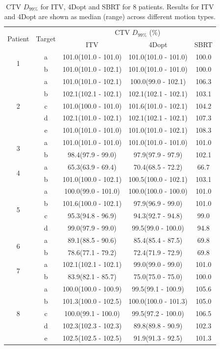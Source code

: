
\begin{table}[H]
	\centering
	\caption{CTV $D_{99\%}$ for ITV, 4Dopt and SBRT for 8 patients. Results for ITV and 4Dopt are shown as median (range) across different motion types.}
	\begin{tabular}{c|c|c|c|c}
		\hline\hline
		\multirow{2}{*}{Patient} & \multirow{2}{*}{Target} & \multicolumn{3}{|c}{CTV $D_{99\%}$ (\%)}  \\
		 &  & ITV & 4Dopt & SBRT \\
		 \hline
		 
\multirow{2}{*}{1} & a & 101.0(101.0 - 101.0) & 101.0(101.0 - 101.0) & 100.0\\ 
 & b & 101.0(101.0 - 102.1) & 101.0(101.0 - 101.0) & 100.0\\ 
 \hline
\multirow{5}{*}{2} & a & 101.0(101.0 - 102.1) & 100.0(99.0 - 102.1) & 106.3\\ 
 & b & 102.1(102.1 - 102.1) & 102.1(102.1 - 102.1) & 103.1\\ 
 & c & 101.0(100.0 - 101.0) & 101.6(101.0 - 102.1) & 104.2\\ 
 & d & 102.1(101.0 - 102.1) & 102.1(102.1 - 102.1) & 107.3\\ 
 & e & 101.0(101.0 - 101.0) & 101.0(101.0 - 102.1) & 108.3\\ 
 \hline
\multirow{2}{*}{3} & a & 101.0(101.0 - 101.0) & 101.0(101.0 - 101.0) & 101.0\\ 
 & b & 98.4(97.9 - 99.0) & 97.9(97.9 - 97.9) & 102.1\\ 
 \hline
\multirow{2}{*}{4} & a & 65.3(63.9 - 69.4) & 70.4(68.5 - 72.2) & 66.7\\ 
 & b & 101.0(100.0 - 102.1) & 100.5(100.0 - 102.1) & 103.1\\ 
 \hline
\multirow{4}{*}{5} & a & 100.0(99.0 - 101.0) & 100.0(100.0 - 100.0) & 101.0\\ 
 & b & 101.6(100.0 - 102.1) & 97.9(96.9 - 99.0) & 101.0\\ 
 & c & 95.3(94.8 - 96.9) & 94.3(92.7 - 94.8) & 99.0\\ 
 & d & 99.0(97.9 - 99.0) & 99.5(99.0 - 100.0) & 94.8\\ 
 \hline
\multirow{2}{*}{6} & a & 89.1(88.5 - 90.6) & 85.4(85.4 - 87.5) & 69.8\\ 
 & b & 78.6(77.1 - 79.2) & 72.4(71.9 - 72.9) & 69.8\\ 
 \hline
\multirow{2}{*}{7} & a & 102.1(102.1 - 102.1) & 99.0(99.0 - 99.0) & 101.0\\ 
 & b & 83.9(82.1 - 85.7) & 75.0(75.0 - 75.0) & 100.0\\ 
 \hline
\multirow{5}{*}{8} & a & 100.0(100.0 - 100.9) & 99.5(99.1 - 100.9) & 105.6\\ 
 & b & 101.3(100.0 - 102.5) & 100.0(100.0 - 101.3) & 105.0\\ 
 & c & 100.0(99.1 - 100.0) & 99.5(97.2 - 100.0) & 106.5\\ 
 & d & 102.3(102.3 - 102.3) & 89.8(89.8 - 90.9) & 102.3\\ 
 & e & 102.5(102.5 - 102.5) & 91.9(91.3 - 92.5) & 101.3\\ 
 \hline


\end{tabular}
\end{table}
